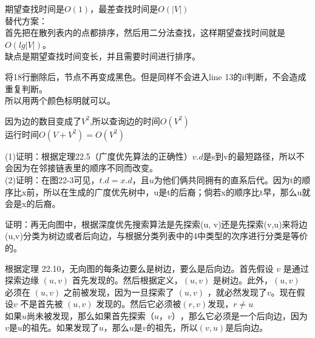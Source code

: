 \documentclass[a4paper, justified]{tufte-handout}
\begin{document}
\begin{solution}
  期望查找时间是$O(1)$，最差查找时间是$O(|V|)$ \\
  替代方案：\\
  首先把在散列表内的点都排序，然后用二分法查找，这样期望查找时间就是$O(lg|V|)$。\\
  缺点是期望查找时间变长，并且需要时间进行排序。
\end{solution}

\begin{problem}
\end{problem}

\begin{solution}
  将18行删除后，节点不再变成黑色。但是同样不会进入line 13的if判断，不会造成重复判断。\\
  所以用两个颜色标明就可以。
\end{solution}

\begin{problem}[TC 22.2-4]
\end{problem}

\begin{solution}
  因为边的数目变成了$V^2$,所以查询边的时间$O(V^2)$\\
  运行时间$O(V+V^2) = O(V^2)$
\end{solution}

\begin{problem}[TC 22.2-5]
\end{problem}

\begin{solution}
  (1)证明：根据定理22.5（广度优先算法的正确性）$v.d$是s到v的最短路径，所以不会因为在邻接链表里的顺序不同而改变。\\
  (2)证明：在图22-3可见，$t.d = x.d$，且$u$为他们俩共同拥有的直系后代。因为t的顺序比x前，所以在生成的广度优先树中，u是t的后裔；倘若x的顺序比t早，那么u就会是x的后裔。
\end{solution}

\begin{problem}[TC 22.3-6]
证明：再无向图中，根据深度优先搜索算法是先探索(u, v)还是先探索(v,u)来将边(u,v)分类为树边或者后向边，与根据分类列表中的4中类型的次序进行分类是等价的。\\
\end{problem}

\begin{solution}

  根据定理 22.10，无向图的每条边要么是树边，要么是后向边。首先假设 $v$ 是通过探索边缘 $(u, v)$ 首先发现的。然后根据定义，$(u, v)$ 是树边。此外，$(u, v)$ 必须在 $(u, v)$ 之前被发现，因为一旦探索了 $(u, v)$ ，就必然发现了$v$。现在假设$v$ 不是首先被 $(u, v)$ 发现的。然后它必须被$(r, v)$发现，$r \ne u$\\

  如果$u$尚未被发现，那么如果首先探索$（u，v）$，那么它必须是一个后向边，因为$v$是$u$的祖先。如果发现了$u$，那么$u$是$v$的祖先，所以$(v, u)$是后向边。\\
\end{solution}
\end{document}
